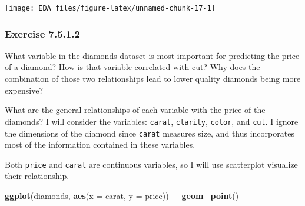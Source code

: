 \documentclass[]{book}
\newenvironment{Shaded}{\begin{snugshade}}{\end{snugshade}}
\newcommand{\DataTypeTok}[1]{\textcolor[rgb]{0.13,0.29,0.53}{#1}}
\newcommand{\DecValTok}[1]{\textcolor[rgb]{0.00,0.00,0.81}{#1}}
\newcommand{\KeywordTok}[1]{\textcolor[rgb]{0.13,0.29,0.53}{\textbf{#1}}}
\newcommand{\NormalTok}[1]{#1}
\newcommand{\OperatorTok}[1]{\textcolor[rgb]{0.81,0.36,0.00}{\textbf{#1}}}
\newcommand{\StringTok}[1]{\textcolor[rgb]{0.31,0.60,0.02}{#1}}
\theoremstyle{plain}
\theoremstyle{remark}
\begin{document}
\begin{Shaded}
\end{Shaded}

\begin{center}\texttt{[image: EDA\_files/figure-latex/unnamed-chunk-17-1]} \end{center}

\hypertarget{exercise-7.5.1.2}{%
\subsubsection*{\texorpdfstring{Exercise
{7.5.1.2}}{Exercise 7.5.1.2}}\label{exercise-7.5.1.2}}

What variable in the diamonds dataset is most important for predicting
the price of a diamond? How is that variable correlated with cut? Why
does the combination of those two relationships lead to lower quality
diamonds being more expensive?

What are the general relationships of each variable with the price of
the diamonds? I will consider the variables: \texttt{carat},
\texttt{clarity}, \texttt{color}, and \texttt{cut}. I ignore the
dimensions of the diamond since \texttt{carat} measures size, and thus
incorporates most of the information contained in these variables.

Both \texttt{price} and \texttt{carat} are continuous variables, so I
will use scatterplot visualize their relationship.

\begin{Shaded}
\begin{Highlighting}[]
\KeywordTok{ggplot}\NormalTok{(diamonds, }\KeywordTok{aes}\NormalTok{(}\DataTypeTok{x =}\NormalTok{ carat, }\DataTypeTok{y =}\NormalTok{ price)) }\OperatorTok{+}
\StringTok{  }\KeywordTok{geom_point}\NormalTok{()}
\end{Highlighting}
\end{Shaded}
\end{document}
